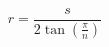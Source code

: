 \documentclass[12pt]{article}
\begin{document}
\[
    r = \frac{s}{2\tan \left(\frac{\pi}{n}\right)}
\]
\end{document}
